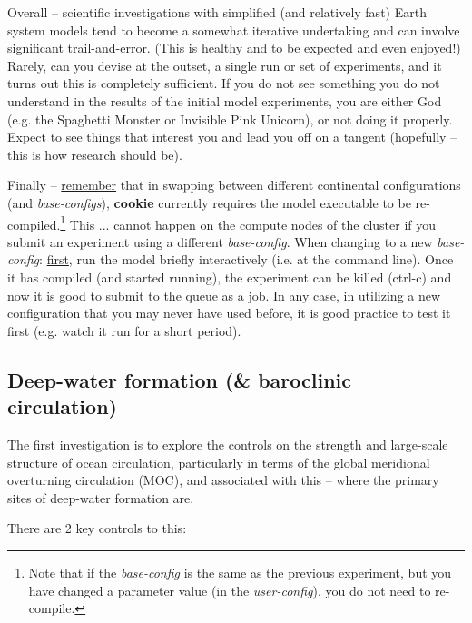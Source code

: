 \noindent Overall -- scientific investigations with simplified (and relatively fast) Earth system models tend to become a somewhat iterative undertaking and can involve significant trail-and-error. (This is healthy and to be expected and even enjoyed!) Rarely, can you devise at the outset, a single run or set of experiments, and it turns out this is completely sufficient. If you do not see something you do not understand in the results of the initial model experiments, you are either God (e.g. the Spaghetti Monster or Invisible Pink Unicorn), or not doing it properly. Expect to see things that interest you and lead you off on a tangent (hopefully -- this is how research should be).

Finally -- \uline{remember} that in swapping between different continental configurations (and \textit{base-configs}), \textbf{cookie} currently requires the model executable to be  re-compiled.\footnote{Note that if the \textit{base-config} is the same as the previous experiment, but you have changed a parameter value (in the \textit{user-config}), you do not need to re-compile.} This ... cannot happen on the compute nodes of the cluster if you submit an experiment using a different \textit{base-config}. When changing to a new \textit{base-config}: \uline{first}, run the model briefly interactively (i.e. at the command line). Once it has compiled (and started running), the experiment can be killed (\textsf{ctrl-c}) and now it is good to submit to the queue as a job. In any case, in utilizing a new configuration that you may never have used before, it is good practice to test it first (e.g. watch it run for a short period).


\subsection{Deep-water formation (\& baroclinic circulation)}

The first investigation is to explore the controls on the strength and large-scale structure of ocean circulation, particularly in terms of the global meridional overturning circulation (MOC), and associated with this -- where the primary sites of deep-water formation are.

There are  2 key controls to this:

